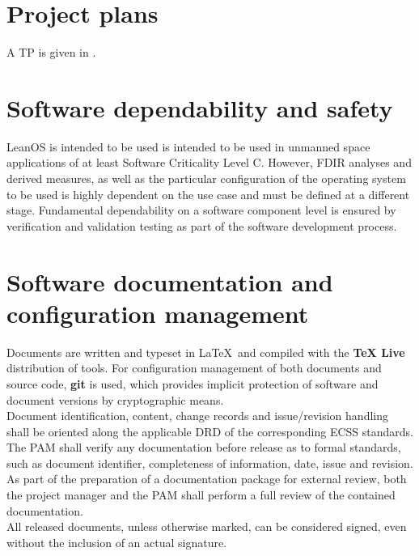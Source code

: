 \section{Project plans}

A \glsdesc{TP} is given in \cite{leanosTP}.


\section{Software dependability and safety}

LeanOS is intended to be used is intended to be used in unmanned space
applications of at least Software Criticality Level C. However, \gls{FDIR}
analyses and derived measures, as well as the particular configuration of
the operating system to be used is highly dependent on the use case and must
be defined at a different stage. Fundamental dependability on a software
component level is ensured by verification and validation testing as part of the
software development process.


\section{Software documentation and configuration management}

Documents are written and typeset in \LaTeX\ and compiled with the \textbf{TeX Live}
distribution of tools. For configuration management of both documents and source
code, \textbf{git} is used, which provides implicit protection of software and
document versions by cryptographic means.\\

\noindent
Document identification, content, change records and issue/revision handling
shall be oriented along the applicable \gls{DRD} of the corresponding ECSS
standards.\\

\noindent
The \gls{PAM} shall verify any documentation before release as to formal
standards, such as document identifier, completeness of information, date,
issue and revision.\\

\noindent
As part of the preparation of a documentation package for external review, both
the project manager and the \gls{PAM} shall perform a full review of the
contained documentation.\\

\noindent
All released documents, unless otherwise marked, can be considered signed, even
without the inclusion of an actual signature.\\

